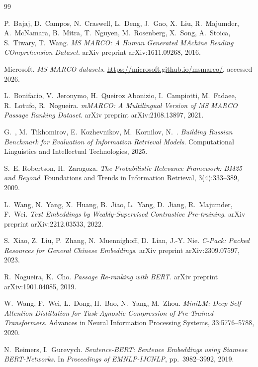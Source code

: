 \documentclass[runningheads,a4paper]{llncs}
\begin{document}
\begin{thebibliography}{99}

P.~Bajaj, D.~Campos, N.~Craswell, L.~Deng, J.~Gao, X.~Liu, R.~Majumder, A.~McNamara, B.~Mitra, T.~Nguyen, M.~Rosenberg, X.~Song, A.~Stoica, S.~Tiwary, T.~Wang.
\newblock \textit{MS MARCO: A Human Generated MAchine Reading COmprehension Dataset}.
\newblock arXiv preprint arXiv:1611.09268, 2016.

Microsoft.
\newblock \textit{MS MARCO datasets}.
\newblock \url{https://microsoft.github.io/msmarco/}, accessed 2026.

L.~Bonifacio, V.~Jeronymo, H.~Queiroz Abonizio, I.~Campiotti, M.~Fadaee, R.~Lotufo, R.~Nogueira.
\newblock \textit{mMARCO: A Multilingual Version of MS MARCO Passage Ranking Dataset}.
\newblock arXiv preprint arXiv:2108.13897, 2021.

G.~, M.~Tikhomirov, E.~Kozhevnikov, M.~Kornilov, N.~.
\newblock \textit{Building Russian Benchmark for Evaluation of Information Retrieval Models}.
\newblock Computational Linguistics and Intellectual Technologies, 2025.

S.~E. Robertson, H.~Zaragoza.
\newblock \textit{The Probabilistic Relevance Framework: BM25 and Beyond}.
\newblock Foundations and Trends in Information Retrieval, 3(4):333--389, 2009.

L.~Wang, N.~Yang, X.~Huang, B.~Jiao, L.~Yang, D.~Jiang, R.~Majumder, F.~Wei.
\newblock \textit{Text Embeddings by Weakly-Supervised Contrastive Pre-training}.
\newblock arXiv preprint arXiv:2212.03533, 2022.

S.~Xiao, Z.~Liu, P.~Zhang, N.~Muennighoff, D.~Lian, J.-Y. Nie.
\newblock \textit{C-Pack: Packed Resources for General Chinese Embeddings}.
\newblock arXiv preprint arXiv:2309.07597, 2023.

R.~Nogueira, K.~Cho.
\newblock \textit{Passage Re-ranking with BERT}.
\newblock arXiv preprint arXiv:1901.04085, 2019.

W.~Wang, F.~Wei, L.~Dong, H.~Bao, N.~Yang, M.~Zhou.
\newblock \textit{MiniLM: Deep Self-Attention Distillation for Task-Agnostic Compression of Pre-Trained Transformers}.
\newblock Advances in Neural Information Processing Systems, 33:5776--5788, 2020.

N.~Reimers, I.~Gurevych.
\newblock \textit{Sentence-BERT: Sentence Embeddings using Siamese BERT-Networks}.
\newblock In \textit{Proceedings of EMNLP-IJCNLP}, pp.~3982--3992, 2019.


\end{thebibliography}
\end{document}

